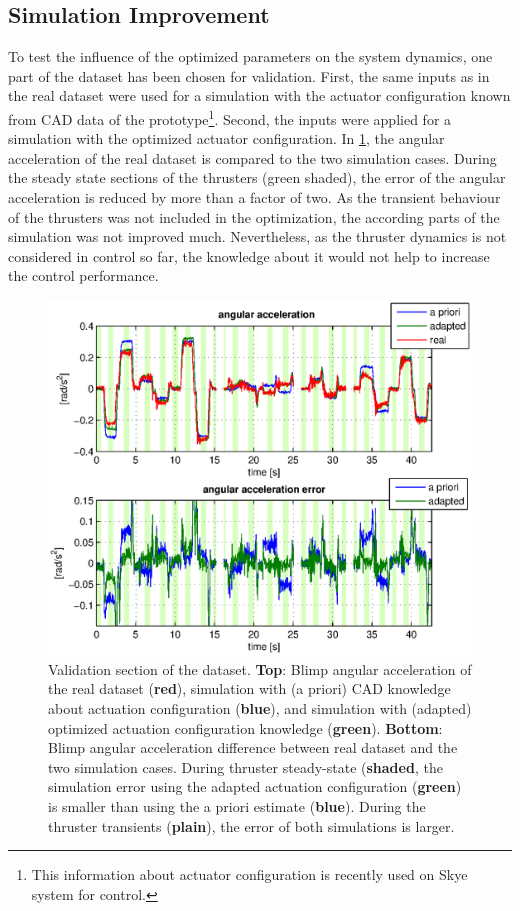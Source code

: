 \subsection{Simulation Improvement}
To test the influence of the optimized parameters on the system dynamics, one part of the dataset has been chosen for validation.
First, the same inputs as in the real dataset were used for a simulation with the actuator configuration known from CAD data of the prototype\footnote{
This information about actuator configuration is recently used on Skye system for control.}.
Second, the inputs were applied for a simulation with the optimized actuator configuration.
In \cref{fig:result_sim_improve_and_error}, the angular acceleration of the real dataset is compared to the two simulation cases.
During the steady state sections of the thrusters (green shaded), the error of the angular acceleration is reduced by more than a factor of two.
As the transient behaviour of the thrusters was not included in the optimization, the according parts of the simulation was not improved much.
Nevertheless, as the thruster dynamics is not considered in control so far, the knowledge about it would not help to increase the control performance.

\begin{figure}[hbtp]
\centering
\includegraphics[scale=0.8]{images/results/compare_alpha_x.eps}
\caption{Validation section of the dataset. \textbf{Top}: Blimp angular acceleration of the real dataset (\textbf{red}), simulation with (a priori) CAD knowledge about actuation configuration (\textbf{blue}), and simulation with (adapted) optimized actuation configuration knowledge (\textbf{green}).
\textbf{Bottom}: Blimp angular acceleration difference between real dataset and the two simulation cases.
During thruster steady-state (\textbf{shaded}, the simulation error using the adapted actuation configuration (\textbf{green}) is smaller than using the a priori estimate (\textbf{blue}).
During the thruster transients (\textbf{plain}), the error of both simulations is larger.
}
\label{fig:result_sim_improve_and_error}
\end{figure}

